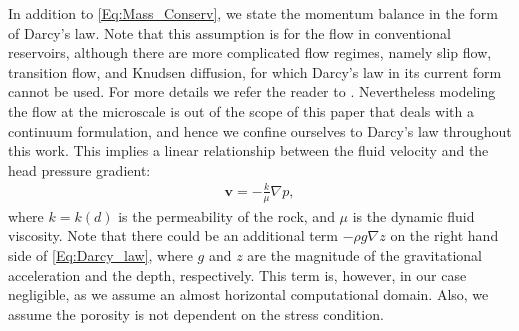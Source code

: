 
In addition to \eqref{Eq:Mass_Conserv}, we state the momentum balance in the form of Darcy's law. {Note that this assumption is for the flow in conventional reservoirs, although there are more complicated flow regimes, namely slip flow, transition flow, and Knudsen diffusion, for which Darcy's law in its current form cannot be used. For more details we refer the reader to  \cite{javadpour2007nanoscale,javadpour2009nanopores,hosseini2015novel,civan2010effective}. Nevertheless modeling the flow at the microscale is out of the scope of this paper that deals with a continuum formulation, and hence we confine ourselves to Darcy's law throughout this work. This implies} a linear relationship between the fluid velocity and the head pressure gradient:
\begin{equation}\label{Eq:Darcy_law}
\begin{aligned}
{\bm{v}} = -\frac{k}{\mu} \nabla p,
\end{aligned}
\end{equation}
where $k=k(d)$ is the permeability of the rock, and $\mu$ is the dynamic fluid viscosity. %
Note that there could be an additional term $- \rho g\nabla z$ %
on the right hand side of \eqref{Eq:Darcy_law}, where $g$ and $z$ are the magnitude of the gravitational acceleration and the depth, respectively. This term is, however, in our case negligible, as we assume an almost horizontal computational domain.
Also, we assume the porosity is not dependent on the stress condition. 

